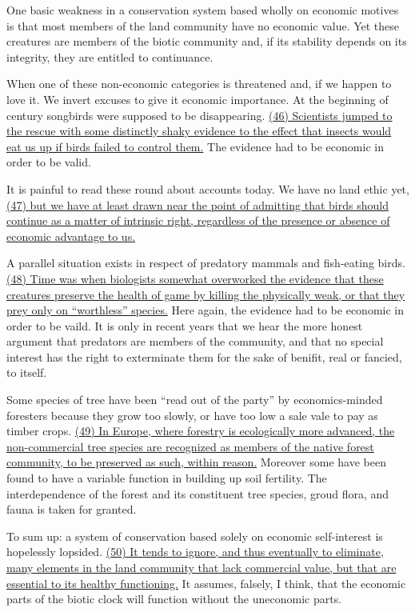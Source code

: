 
\qquad One basic weakness in a conservation system based wholly on economic motives is that most members of the land community  have no economic value. Yet these creatures are members of the biotic community and, if its stability depends on its integrity, they are entitled to continuance.

\qquad When one of these non-economic categories is threatened and, if we happen to love it. We invert excuses to give it economic importance. At the beginning of century songbirds were supposed to be disappearing. \ul{(46) Scientists jumped to the rescue with some distinctly shaky evidence to the effect that insects would eat us up if birds failed to control them.} The evidence had to be economic in order to be valid.

\qquad It is painful to read these round about accounts today. We have no land ethic yet, \ul{(47) but we have at least drawn near the point of admitting that birds should continue as a matter of intrinsic right, regardless of the presence or absence of economic advantage to us.}

\qquad A parallel situation exists in respect of predatory mammals and fish-eating birds. \ul{(48) Time was when biologists somewhat overworked the evidence that these creatures preserve the health of game by killing the physically weak, or that they prey only on ``worthless'' species.} Here again, the evidence had to be economic in order to be vaild. It is only in recent years that we hear the more honest argument that predators are members of the community, and that no special interest has the right to exterminate them for the sake of benifit, real or fancied, to itself.

\qquad Some species of tree have been ``read out of the party'' by economics-minded foresters because they grow too slowly, or have too low a sale vale to pay as timber crops. \ul{(49) In Europe, where forestry is ecologically more advanced, the non-commercial tree species are recognized as members of the native forest community, to be preserved as such, within reason.} Moreover some have been found to have a variable function in building up soil fertility. The interdependence of the forest and its constituent tree species, groud flora, and fauna is taken for granted.

\qquad To sum up: a system of conservation based solely on economic self-interest is hopelessly lopsided. \ul{(50) It tends to ignore, and thus eventually to eliminate, many elements in the land community that lack commercial value, but that are essential to its healthy functioning.} It assumes, falsely, I think, that the economic parts of the biotic clock will function without the uneconomic parts.